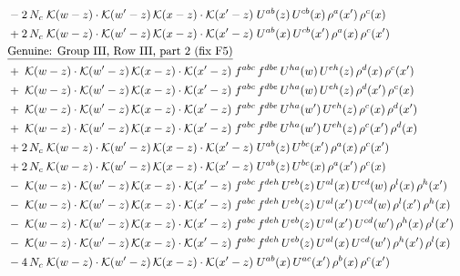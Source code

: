 \documentclass[10pt]{article}
\numberwithin{equation}{section}
\begin{document}
\begin{align}
&\quad -2\,N_c\;\mathcal{K}(w-z)\cdot\mathcal{K}(w'-z)\,\mathcal{K}(x-z)\cdot\mathcal{K}(x'-z)\;U^{ab}(z)\,U^{cb}(x)\,\rho^{a}(x')\,\rho^{c}(x)\notag\\
&\quad +2\,N_c\;\mathcal{K}(w-z)\cdot\mathcal{K}(w'-z)\,\mathcal{K}(x-z)\cdot\mathcal{K}(x'-z)\;U^{ab}(x)\,U^{cb}(x')\,\rho^{a}(x)\,\rho^{c}(x')\notag\\
&\quad\underline{\text{Genuine: Group III, Row III, part 2 (fix F5)}}\notag\\
&\quad +\;\mathcal{K}(w-z)\cdot\mathcal{K}(w'-z)\,\mathcal{K}(x-z)\cdot\mathcal{K}(x'-z)\;f^{abc}\,f^{dbe}\,U^{ha}(w)\,U^{eh}(z)\,\rho^{d}(x)\,\rho^{c}(x')\notag\\
&\quad +\;\mathcal{K}(w-z)\cdot\mathcal{K}(w'-z)\,\mathcal{K}(x-z)\cdot\mathcal{K}(x'-z)\;f^{abc}\,f^{dbe}\,U^{ha}(w)\,U^{eh}(z)\,\rho^{d}(x')\,\rho^{c}(x)\notag\\
&\quad +\;\mathcal{K}(w-z)\cdot\mathcal{K}(w'-z)\,\mathcal{K}(x-z)\cdot\mathcal{K}(x'-z)\;f^{abc}\,f^{dbe}\,U^{ha}(w')\,U^{eh}(z)\,\rho^{c}(x)\,\rho^{d}(x')\notag\\
&\quad +\;\mathcal{K}(w-z)\cdot\mathcal{K}(w'-z)\,\mathcal{K}(x-z)\cdot\mathcal{K}(x'-z)\;f^{abc}\,f^{dbe}\,U^{ha}(w')\,U^{eh}(z)\,\rho^{c}(x')\,\rho^{d}(x)\notag\\
&\quad +2\,N_c\;\mathcal{K}(w-z)\cdot\mathcal{K}(w'-z)\,\mathcal{K}(x-z)\cdot\mathcal{K}(x'-z)\;U^{ab}(z)\,U^{bc}(x')\,\rho^{a}(x)\,\rho^{c}(x')\notag\\
&\quad +2\,N_c\;\mathcal{K}(w-z)\cdot\mathcal{K}(w'-z)\,\mathcal{K}(x-z)\cdot\mathcal{K}(x'-z)\;U^{ab}(z)\,U^{bc}(x)\,\rho^{a}(x')\,\rho^{c}(x)\notag\\
&\quad -\;\mathcal{K}(w-z)\cdot\mathcal{K}(w'-z)\,\mathcal{K}(x-z)\cdot\mathcal{K}(x'-z)\;f^{abc}\,f^{deh}\,U^{eb}(z)\,U^{al}(x)\,U^{cd}(w)\,\rho^{l}(x)\,\rho^{h}(x')\notag\\
&\quad -\;\mathcal{K}(w-z)\cdot\mathcal{K}(w'-z)\,\mathcal{K}(x-z)\cdot\mathcal{K}(x'-z)\;f^{abc}\,f^{deh}\,U^{eb}(z)\,U^{al}(x')\,U^{cd}(w)\,\rho^{l}(x')\,\rho^{h}(x)\notag\\
&\quad -\;\mathcal{K}(w-z)\cdot\mathcal{K}(w'-z)\,\mathcal{K}(x-z)\cdot\mathcal{K}(x'-z)\;f^{abc}\,f^{deh}\,U^{eb}(z)\,U^{al}(x')\,U^{cd}(w')\,\rho^{h}(x)\,\rho^{l}(x')\notag\\
&\quad -\;\mathcal{K}(w-z)\cdot\mathcal{K}(w'-z)\,\mathcal{K}(x-z)\cdot\mathcal{K}(x'-z)\;f^{abc}\,f^{deh}\,U^{eb}(z)\,U^{al}(x)\,U^{cd}(w')\,\rho^{h}(x')\,\rho^{l}(x)\notag\\
&\quad -4\,N_c\;\mathcal{K}(w-z)\cdot\mathcal{K}(w'-z)\,\mathcal{K}(x-z)\cdot\mathcal{K}(x'-z)\;U^{ab}(x)\,U^{ac}(x')\,\rho^{b}(x)\,\rho^{c}(x')\notag\\

\end{align}
\end{document}
